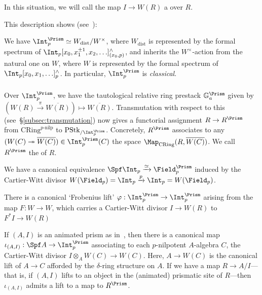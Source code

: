 \documentclass[10pt]{amsart}
\begin{document}
In this situation, we will call the map $I\to W(R)$ a  over $R$.

This description shows (see~\cite[Proposition 8.4]{bhatt2022prismatization}):
\begin{proposition}
\label{prop:ZpDelta_presentation}
We have $\Int_p^\Prism \simeq W_{\mathrm{dist}}/W^\times$, where $W_{\mathrm{dist}}$ is represented by the formal spectrum of $\Int_p[x_0,x_1^{\pm 1},x_2,\ldots]_{(x_0,p)}^{\wedge}$, and inherits the $W^\times$-action from the natural one on $W$, where $W$ is represented by the formal spectrum of $\Int_p[x_0,x_1,\ldots]_p^{\wedge}$. In particular, $\Int_p^\Prism$ is \emph{classical}.
\end{proposition}

\subsubsection{}
Over $\Int_p^\Prism$, we have the tautological relative ring prestack $\mathbb{G}_a^\Prism$ given by $(W(R)\xrightarrow{\pi}\overline{W(R)})\mapsto \overline{W(R)}$. Transmutation with respect to this (see~\S\ref{subsec:transmutation}) now gives a functorial assignment $R\to R^{\Prism}$ from $\mathrm{CRing}^{p\text{-nilp}}$ to $\mathrm{PStk}_{/\Int_p^\Prism}$. Concretely, $R^\Prism$ associates to any $(W(C)\twoheadrightarrow\overline{W(C)})\in \Int_p^\Prism(C)$ the space $\Map_{\mathrm{CRing}}(R,\overline{W(C)})$. We call $R^\Prism$ the  of $R$.

\begin{remark}
\label{rem:prismatization_of_Fp}
We have a canonical equivalence $\Spf \Int_p\xrightarrow{\simeq}\Field_p^\Prism$ induced by the Cartier-Witt divisor $W(\Field_p) = \Int_p\xrightarrow{p} \Int_p=W(\Field_p)$.
\end{remark}

\begin{remark}
\label{rem:frob_endomorphism}
There is a canonical `Frobenius lift' $\varphi:\Int_p^\Prism\to \Int_p^\Prism$ arising from the map $F:W\to W$, which carries a Cartier-Witt divisor $I\to W(R)$ to $F^*I \to W(R)$
\end{remark}

\begin{remark}
\label{rem:prisms_and_prismatization}
If $(A,I)$ is an animated prism as in~\cite[\S 2]{bhatt2022prismatization}, then there is a canonical map $\iota_{(A,I)}:\Spf A \to \Int_p^{\Prism}$ associating to each $p$-nilpotent $A$-algebra $C$, the Cartier-Witt divisor $I\otimes_AW(C) \to W(C)$. Here, $A\to W(C)$ is the canonical lift of $A\to C$ afforded by the $\delta$-ring structure on $A$. If we have a map $R\to A/I$---that is, if $(A,I)$ lifts to an object in the (animated) prismatic site of $R$---then $\iota_{(A,I)}$ admits a lift to a map to $R^{\Prism}$. 
\end{remark}
\end{document}
